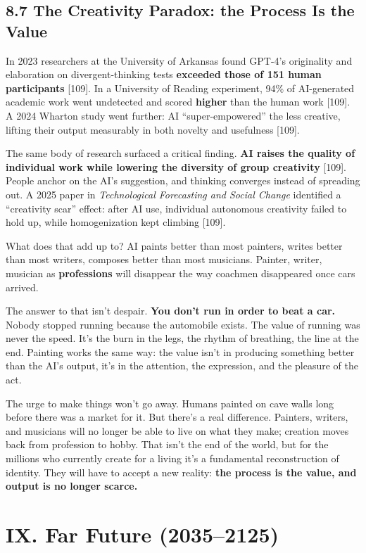 \documentclass[11pt,a4paper]{article}
\begin{document}
\subsection{8.7 The Creativity Paradox: the Process Is the Value}

In 2023 researchers at the University of Arkansas found GPT-4's originality and elaboration on divergent-thinking tests \textbf{exceeded those of 151 human participants}{} [109]. In a University of Reading experiment, 94\% of AI-generated academic work went undetected and scored \textbf{higher} than the human work [109]. A 2024 Wharton study went further: AI ``super-empowered'' the less creative, lifting their output measurably in both novelty and usefulness [109].

The same body of research surfaced a critical finding. \textbf{AI raises the quality of individual work while lowering the diversity of group creativity}{} [109]. People anchor on the AI's suggestion, and thinking converges instead of spreading out. A 2025 paper in \textit{Technological Forecasting and Social Change} identified a ``creativity scar'' effect: after AI use, individual autonomous creativity failed to hold up, while homogenization kept climbing [109].

What does that add up to? AI paints better than most painters, writes better than most writers, composes better than most musicians. Painter, writer, musician as \textbf{professions} will disappear the way coachmen disappeared once cars arrived.

The answer to that isn't despair. \textbf{You don't run in order to beat a car.} Nobody stopped running because the automobile exists. The value of running was never the speed. It's the burn in the legs, the rhythm of breathing, the line at the end. Painting works the same way: the value isn't in producing something better than the AI's output, it's in the attention, the expression, and the pleasure of the act.

The urge to make things won't go away. Humans painted on cave walls long before there was a market for it. But there's a real difference. Painters, writers, and musicians will no longer be able to live on what they make; creation moves back from profession to hobby. That isn't the end of the world, but for the millions who currently create for a living it's a fundamental reconstruction of identity. They will have to accept a new reality: \textbf{the process is the value, and output is no longer scarce.}

\section{IX. Far Future (2035--2125)}
\end{document}
